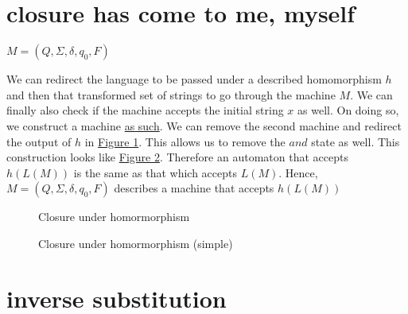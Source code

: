 \documentclass[11pt,letterpaper]{article}
\begin{document}
\section{closure has come to me, myself}
\begin{center}
    $M = (Q,\Sigma,\delta,q_0,F)$
\end{center}
We can redirect the language to be passed under a described homomorphism $h$ and then that transformed set of strings to go through the machine $M$. We can finally also check if the machine accepts the initial string $x$ as well. On doing so, we construct a machine \hyperref[fig:4a]{as such}.
We can remove the second machine and redirect the output of $h$ in \hyperref[fig:4a]{Figure 1}. This allows us to remove the $and$ state as well. This construction looks like \hyperref[fig:4b]{Figure 2}.
Therefore an automaton that accepts $h(L(M))$ is the same as that which accepts $L(M)$. Hence, $M = (Q,\Sigma,\delta,q_0,F)$ describes a machine that accepts $h(L(M))$ \pagebreak
\begin{figure}[!htp]
\label{fig:4a}
\centering
{}
\caption{Closure under homormorphism}
\end{figure}
\begin{figure}[!htp]
\label{fig:4b}
\centering
{}
\caption{Closure under homormorphism (simple)}
\end{figure}

\section{inverse substitution}
\end{document}
